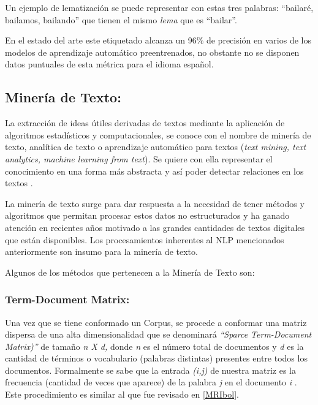 \documentclass[
  12pt,
  openany]{book}
\begin{document}
Un ejemplo de lematización se puede representar con estas tres palabras: ``bailaré, bailamos, bailando'' que tienen el mismo \emph{lema} que es ``bailar''.

En el estado del arte este etiquetado alcanza un 96\% de precisión en varios de los modelos de aprendizaje automático preentrenados, no obstante no se disponen datos puntuales de esta métrica para el idioma español.

\hypertarget{textmin}{%
\subsection{Minería de Texto:}\label{textmin}}

La extracción de ideas útiles derivadas de textos mediante la aplicación de algoritmos estadísticos y computacionales, se conoce con el nombre de minería de texto, analítica de texto o aprendizaje automático para textos (\emph{text mining, text analytics, machine learning from text}). Se quiere con ella representar el conocimiento en una forma más abstracta y así poder detectar relaciones en los textos \citep{aggarwal2018a}.

La minería de texto surge para dar respuesta a la necesidad de tener métodos y algoritmos que permitan procesar estos datos no estructurados \citep{miningt2012} y ha ganado atención en recientes años motivado a las grandes cantidades de textos digitales que están disponibles. Los procesamientos inherentes al NLP mencionados anteriormente son insumo para la minería de texto.

Algunos de los métodos que pertenecen a la Minería de Texto son:

\hypertarget{tdm}{%
\subsubsection{Term-Document Matrix:}\label{tdm}}

Una vez que se tiene conformado un Corpus, se procede a conformar una matriz dispersa de una alta dimensionalidad que se denominará \emph{``Sparce Term-Document Matrix)''} de tamaño \emph{n X d,} donde \emph{n} es el número total de documentos y \emph{d} es la cantidad de términos o vocabulario (palabras distintas) presentes entre todos los documentos. Formalmente se sabe que la entrada \emph{(i,j)} de nuestra matriz es la frecuencia (cantidad de veces que aparece) de la palabra \emph{j} en el documento \emph{i} . Este procedimiento es similar al que fue revisado en \ref{MRIbol}.
\end{document}
